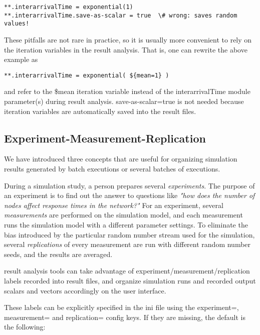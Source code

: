 \begin{Verbatim}[commandchars=\\\{\}]
**.interarrivalTime = exponential(1)
**.interarrivalTime.save-as-scalar = true  \# wrong: saves random values!
\end{Verbatim}


These pitfalls are not rare in practice, so it is usually more
convenient to rely on the iteration variables in the result analysis.
That is, one can rewrite the above example as

\begin{Verbatim}[commandchars=\\\{\}]
**.interarrivalTime = exponential( ${mean=1} )
\end{Verbatim}

and refer to the \$mean iteration variable instead of the
interarrivalTime module parameter(s) during result analysis.
save-as-scalar=true is not needed because iteration variables are
automatically saved into the result files.



\subsection{Experiment-Measurement-Replication}

We have introduced three concepts that are useful for organizing
simulation results generated by batch executions or several batches of
executions.

During a simulation study, a person prepares several
\textit{experiments}. The purpose of an experiment is to find out the
answer to questions like \textit{"how does the number of
nodes affect response times in the network?"} For an
experiment, several \textit{measurements} are performed on the
simulation model, and each measurement runs the simulation model with a
different parameter settings. To eliminate the bias introduced by the
particular random number stream used for the simulation, several
\textit{replications} of every measurement are run with different
random number seeds, and the results are averaged.

{\opp} result analysis tools can take advantage of
experiment/measurement/replication labels recorded into result files,
and organize simulation runs and recorded output scalars and vectors
accordingly on the user interface.

These labels can be explicitly specified in the ini file using the
experiment=, measurement= and replication= config keys. If they are
missing, the default is the following:


